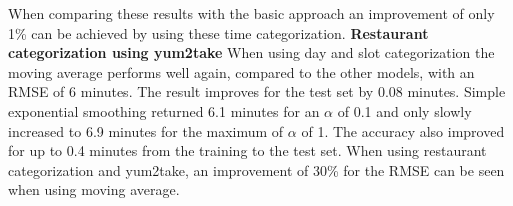 When comparing these results with the basic approach an improvement of only 1\% can be achieved by using these time categorization.
\newline\newline\textbf{Restaurant categorization using yum2take}\newline
When using day and slot categorization the moving average performs well again, compared to the other models, with an RMSE of 6 minutes. The result improves for the test set by 0.08 minutes. Simple exponential smoothing returned 6.1 minutes for an $\alpha$ of 0.1 and only slowly increased to 6.9 minutes for the maximum of $\alpha$ of 1. The accuracy also improved for up to 0.4 minutes from the training to the test set.\newline
When using restaurant categorization and yum2take, an improvement of 30\% for the RMSE can be seen when using moving average.
